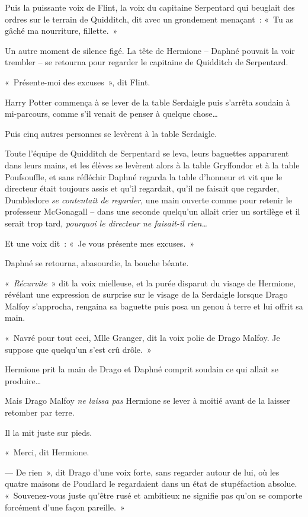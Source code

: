 Puis la puissante voix de Flint, la voix du capitaine Serpentard qui beuglait des ordres sur le terrain de Quidditch, dit avec un grondement menaçant~: «~Tu as gâché ma nourriture, fillette.~»

Un autre moment de silence figé. La tête de Hermione -- Daphné pouvait la voir trembler -- se retourna pour regarder le capitaine de Quidditch de Serpentard.

«~Présente-moi des excuses~», dit Flint.

Harry Potter commença à se lever de la table Serdaigle puis s'arrêta soudain à mi-parcours, comme s'il venait de penser à quelque chose…

Puis cinq autres personnes se levèrent à la table Serdaigle.

Toute l'équipe de Quidditch de Serpentard se leva, leurs baguettes apparurent dans leurs mains, et les élèves se levèrent alors à la table Gryffondor et à la table Poufsouffle, et sans réfléchir Daphné regarda la table d'honneur et vit que le directeur était toujours assis et qu'il regardait, qu'il ne faisait que regarder, Dumbledore \emph{se contentait de regarder}, une main ouverte comme pour retenir le professeur McGonagall -- dans une seconde quelqu'un allait crier un sortilège et il serait trop tard, \emph{pourquoi le directeur ne faisait-il rien…}

Et une voix dit~: «~Je vous présente mes excuses.~»

Daphné se retourna, abasourdie, la bouche béante.

«~\emph{Récurvite}~» dit la voix mielleuse, et la purée disparut du visage de Hermione, révélant une expression de surprise sur le visage de la Serdaigle lorsque Drago Malfoy s'approcha, rengaina sa baguette puis posa un genou à terre et lui offrit sa main.

«~Navré pour tout ceci, Mlle Granger, dit la voix polie de Drago Malfoy. Je suppose que quelqu'un s'est crû drôle.~»

Hermione prit la main de Drago et Daphné comprit soudain ce qui allait se produire…

Mais Drago Malfoy \emph{ne laissa pas} Hermione se lever à moitié avant de la laisser retomber par terre.

Il la mit juste sur pieds.

«~Merci, dit Hermione.

--- De rien~», dit Drago d'une voix forte, sans regarder autour de lui, où les quatre maisons de Poudlard le regardaient dans un état de stupéfaction absolue. «~Souvenez-vous juste qu'être rusé et ambitieux ne signifie pas qu'on se comporte forcément d'une façon pareille.~»

